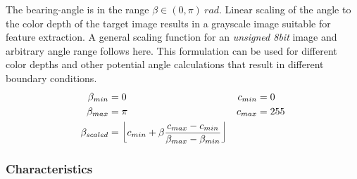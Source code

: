 The \Gls{bearing-angle} is in the range $\beta \in (0, \pi)~rad$.
Linear scaling of the angle to the color depth of the target image results in a grayscale image suitable for feature extraction.
A general scaling function for an \emph{unsigned 8bit} image and arbitrary angle range follows here.
This formulation can be used for different color depths and other potential angle calculations that result in different boundary conditions.
\begin{equation}
\begin{aligned}
    \beta_{min} &= 0 ~& c_{min} &= 0 \\
    \beta_{max} &= \pi ~& c_{max} &= 255 \\
    \beta_{scaled} &= \floor*{c_{min} + \beta \frac{c_{max} - c_{min}}{\beta_{max} - \beta_{min}}}
\end{aligned}
\end{equation}

\subsubsection*{Characteristics}

